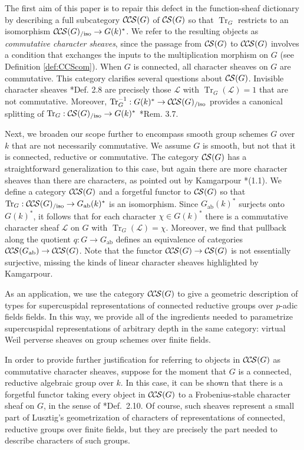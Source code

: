 \documentclass[10pt]{amsart}
\theoremstyle{plain}
\theoremstyle{definition}
\newcommand{\Fq}{k}
\newcommand{\ab}{_{\operatorname{ab}}}
\DeclareMathOperator{\Tr}{Tr}
\newcommand{\TrFrob}[1]{\Tr_{#1}}
\newcommand{\cs}[1]{{\mathcal{#1}}}
\newcommand{\CS}{{\mathcal{C\hskip-0.8pt S}}}
\newcommand{\CCS}{{\mathcal{C\hskip-.8pt C\hskip-0.8pt S}}}
\newcommand{\CSiso}[1]{\CS(#1)_{/\text{iso}}}
\newcommand{\CCSiso}[1]{\CCS(#1)_{/\text{iso}}}
\begin{document}
The first aim of this paper is to repair this defect in the function-sheaf dictionary
 by describing a full subcategory $\CCS(G)$ of $\CS(G)$ so that $\TrFrob{G}$ restricts to an isomorphism $\CCSiso{G} \to G(k)^*$.
We refer to the resulting objects as \emph{commutative character sheaves}, since the passage from $\CS(G)$ to $\CCS(G)$ involves a condition that exchanges the inputs to the multiplication morphism on $G$ (see Definition \ref{def:CCScom}).  
When $G$ is connected, all character sheaves on $G$ are commutative.
This category clarifies several questions about $\CS(G)$.  Invisible character sheaves \cite{cunningham-roe:13a}*{Def. 2.8} are precisely those $\cs{L}$ with $\TrFrob{G}(\cs{L}) = 1$ that are not commutative.  Moreover, $\TrFrob{G}^{-1} : G(k)^* \to \CCSiso{G}$ provides a canonical splitting of $\TrFrob{G} : \CSiso{G} \to G(k)^*$ \cite{cunningham-roe:13a}*{Rem. 3.7}.

Next, we broaden our scope further to encompass smooth group schemes $G$ over $\Fq$ that are not necessarily commutative.
We assume $G$ is smooth, but not that it is connected, reductive or commutative. 
The category $\CS(G)$ has a straightforward generalization to this case, but again
there are more character sheaves than there are characters, as pointed out by Kamgarpour \cite{kamgarpour:09a}*{(1.1)}.
We define a category $\CCS(G)$ and a forgetful functor to $\CS(G)$ so that $\TrFrob{G} : \CCSiso{G} \to G\ab(k)^*$
is an isomorphism.  
Since $G\ab(k)^*$ surjects onto $G(k)^*$, it follows that for each character $\chi \in G(k)^*$ there is a commutative
character sheaf $\cs{L}$ on $G$ with $\TrFrob{G}(\cs{L}) = \chi$. Moreover, we find that pullback along the quotient $q : G \to G\ab$
defines an equivalence of categories $\CCS(G\ab) \to \CCS(G)$.  Note that the functor $\CCS(G) \to \CS(G)$ is not
essentially surjective, missing the kinds of linear character sheaves highlighted by Kamgarpour.
%

As an application, we use the category $\CCS(G)$ to give a geometric description of types for supercuspidal representations of connected reductive groups over $p$-adic fields fields.
In this way, we provide all of the ingredients needed to parametrize supercuspidal representations of arbitrary depth in the same category:
virtual Weil perverse sheaves on group schemes over finite fields. 

In order to provide further justification for referring to objects in $\CCS(G)$ as commutative character sheaves, suppose for the moment that $G$ is a connected, reductive algebraic group over $\Fq$.
In this case, it can be shown that there is a forgetful functor taking every object in $\CCS(G)$ to a Frobenius-stable character sheaf on $G$, in the sense of \cite{lusztig:85a}*{Def.~2.10}.
Of course, such sheaves represent a small part of Lusztig's geometrization of characters of representations of connected, reductive groups over finite fields,
but they are precisely the part needed to describe characters of such groups.
\bigskip
\end{document}
